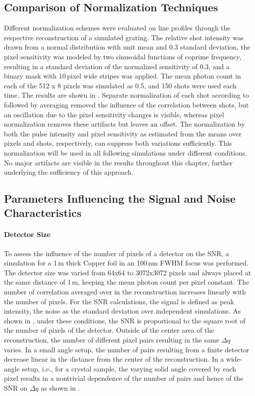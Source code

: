 \subsection{Comparison of Normalization Techniques}
Different normalization schemes were evaluated on line profiles through the respective reconstruction of a simulated grating. The relative shot intensity was drawn from a normal distribution with unit mean and 0.3 standard deviation, the pixel sensitivity was modeled by two sinusoidal functions of coprime frequency, resulting in a standard deviation of the normalized sensitivity of 0.3, and a binary mask with 10\,pixel wide stripes was applied. The mean photon count in each of the 512 x 8 pixels was simulated as 0.5, and 150 shots were used each time. The results are shown in .
Separate normalization of each shot according to   followed by averaging removed the influence of the correlation between shots, but an oscillation due to the pixel sensitivity changes is visible, whereas pixel normalization removes these artifacts but leaves an offset. The normalization by both the pulse intensity and pixel sensitivity as estimated from the means over pixels and shots, respectively, can suppress both variations sufficiently. This normalization will be used in all following simulations under different conditions. No major artifacts are visible in the results throughout this chapter, further underlying the sufficiency of this approach.

\subsection{Parameters Influencing the Signal and Noise Characteristics}
\paragraph{Detector Size}

To assess the influence of the number of pixels of a detector on the SNR, a simulation for a 1\,\textmu m thick Copper foil in an 100\,nm FWHM focus was performed. The detector size was varied from 64x64 to 3072x3072 pixels and always placed at the same distance of 1\,m, keeping the mean photon count per pixel constant. The number of correlation averaged over in the reconstruction increases linearly with the number of pixels. For the SNR calculations, the signal is defined as peak intensity, the noise as the standard deviation over independent simulations.  As shown in , under these conditions, the SNR is proportional to the square root of the number of pixels of the detector. 
Outside of the center area of the reconstruction, the number of different pixel pairs resulting in the same $\Delta{q}$ varies. In a small angle setup, the number of pairs resulting from a finite detector decrease linear in the distance from the center of the reconstruction. In a wide-angle setup, i.e., for a crystal sample, the varying solid angle covered by each pixel results in a nontrivial dependence of the number of pairs and hence of the SNR on $\Delta{q}$ as shown in .




